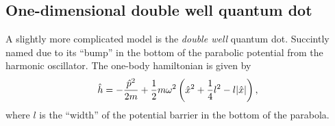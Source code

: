     \subsection{One-dimensional double well quantum dot}
        A slightly more complicated model is the \emph{double well} quantum dot.
        Succintly named due to its ``bump'' in the bottom of the parabolic
        potential from the harmonic oscillator. The one-body hamiltonian is
        given by
        \begin{align}
            \hat{h} = -\frac{\hat{p}^2}{2m}
            + \frac{1}{2} m\omega^2\left( 
                \hat{x}^2
                + \frac{1}{4}l^2
                - l\abs{\hat{x}}
             \right),
        \end{align}
        where $l$ is the ``width'' of the potential barrier in the bottom of the
        parabola.

